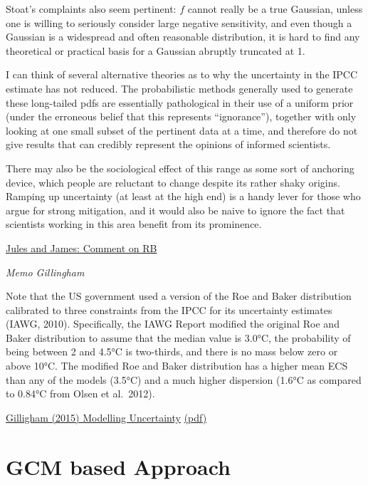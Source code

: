 \documentclass[
]{book}
\begin{document}
Stoat's complaints also seem pertinent:
\(f\) cannot really be a true Gaussian,
unless one is willing to seriously consider large negative sensitivity,
and even though a Gaussian is a widespread and often reasonable distribution,
it is hard to find any theoretical or practical basis for
a Gaussian abruptly truncated at 1.

I can think of several alternative theories as to
why the uncertainty in the IPCC estimate has not reduced.
The probabilistic methods generally used to generate these long-tailed pdfs
are essentially pathological in their use of a uniform prior
(under the erroneous belief that this represents ``ignorance''),
together with only looking at one small subset of the pertinent data at a time,
and therefore do not give results that can credibly represent
the opinions of informed scientists.

There may also be the sociological effect of this range as some sort of anchoring device, which people are reluctant to change despite its rather shaky origins. Ramping up uncertainty (at least at the high end) is a handy lever for those who argue for strong mitigation, and it would also be naive to ignore the fact that scientists working in this area benefit from its prominence.

\href{http://julesandjames.blogspot.com/2007/10/roe-and-baker.html}{Jules and James: Comment on RB}

\emph{Memo Gillingham}

Note that the US government used a version of the Roe and Baker distribution
calibrated to three constraints from the IPCC
for its uncertainty estimates (IAWG, 2010).
Specifically, the IAWG Report modified the original Roe and Baker distribution
to assume that the median value is 3.0°C,
the probability of being between 2 and 4.5°C is two-thirds,
and there is no mass below zero or above 10°C.
The modified Roe and Baker distribution has a higher mean ECS than
any of the models (3.5°C) and
a much higher dispersion (1.6°C as compared to 0.84°C from Olsen et al.~2012).

\href{https://globalchange.mit.edu/publication/16235}{Gilligham (2015) Modelling Uncertainty}
\href{pdf/Gillingham_2015_Modelling_Uncertainty.pdf}{(pdf)}

\hypertarget{gcm-based-approach}{%
\section{GCM based Approach}\label{gcm-based-approach}}
\end{document}
